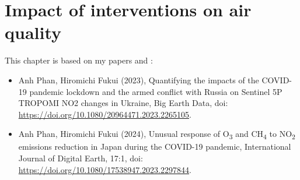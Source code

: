 \chapter{Impact of interventions on air quality} \label{chap3}
\renewcommand{\headrulewidth}{0pt}
\lhead[\thepage]{\rightmark}
\rhead[\rightmark]{\thepage}
\cfoot[]{}
This chapter is based on my papers \citep{aqukrrus2023} and \citep{aqjp2023}:
\begin{itemize}
    \item Anh Phan, Hiromichi Fukui (2023), Quantifying the impacts of the COVID-19 pandemic lockdown and the armed conflict with Russia on Sentinel 5P TROPOMI NO2 changes in Ukraine, Big Earth Data, doi: \url{https://doi.org/10.1080/20964471.2023.2265105}.
    \item Anh Phan, Hiromichi Fukui (2024), Unusual response of O\textsubscript{3} and CH\textsubscript{4} to NO\textsubscript{2} emissions reduction in Japan during the COVID-19 pandemic, International Journal of Digital Earth, 17:1, doi: \url{https://doi.org/10.1080/17538947.2023.2297844}.
\end{itemize}

